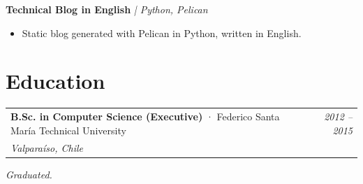 \documentclass[11pt, a4paper]{article}
\makeatletter
\newcommand{\entry}[4]{%
  \vspace{6pt}
  \begin{tabularx}{\textwidth}{@{}X r@{}}
    \textbf{#1} \textcolor{gris}{· #2} & \textcolor{grisClaro}{\small\textit{#4}} \\
    \textcolor{grisClaro}{\small\textit{#3}} & \\
  \end{tabularx}
  \vspace{2pt}
}
\newcommand{\project}[2]{%
  \vspace{6pt}
  \textbf{#1} \quad \textcolor{gris}{\small\textit{| #2}}
  \vspace{2pt}
}
\makeatother
\begin{document}
\project{Technical Blog in English}{Python, Pelican}
\begin{itemize}
  \item Static blog generated with Pelican in Python, written in English.
\end{itemize}
 
\section{Education}
 
\entry{B.Sc. in Computer Science (Executive)}{Federico Santa Mar\'ia Technical University}{Valpara\'iso, Chile}{2012 -- 2015}
\textit{\textcolor{gris}{Graduated.}}
 
\end{document}
